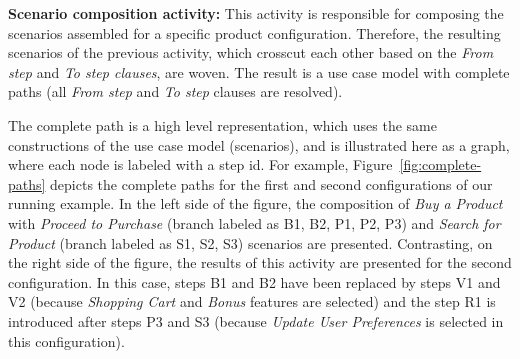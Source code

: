 \documentclass{report}
\begin{document}
\begin{frontmatter}
 {\bf Scenario composition activity:} This activity is responsible for composing the scenarios assembled for a specific product configuration. 
Therefore, the resulting scenarios of the previous activity, which crosscut each other based on the \emph{From step} and \emph{To step clauses}, are woven. The 
 result is a use case model with complete paths (all \emph{From step} and \emph{To step} clauses are resolved).
 
 
The complete path is a high level representation, which uses the same constructions of the use case model (scenarios), and is illustrated here as a graph, where each node is labeled with a step id. For example, Figure~\ref{fig:complete-paths} depicts the complete paths for the first and second configurations of our running example. In the left side of the figure,  the composition of \emph{Buy a Product} with \emph{Proceed to Purchase} (branch labeled as B1, B2, P1, P2, P3) and \emph{Search for Product} (branch labeled as S1, S2, S3) scenarios are presented. Contrasting, on the right side of the figure, the results of this activity are presented for the second configuration. In this case, steps B1 and B2 have been replaced by steps V1 and V2 (because \emph{Shopping Cart} and \emph{Bonus} features are selected) and the step  R1 is introduced after steps P3 and S3 (because \emph{Update User Preferences} is selected in this configuration).
 
 




\end{frontmatter}
\end{document}
